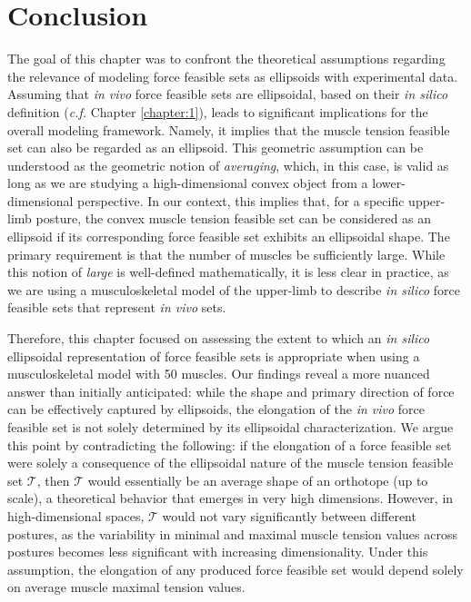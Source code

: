 \section{Conclusion}
The goal of this chapter was to confront the theoretical assumptions regarding the relevance of modeling force feasible sets as ellipsoids with experimental data. Assuming that \emph{in vivo} force feasible sets are ellipsoidal, based on their \emph{in silico} definition (\emph{c.f.} Chapter \ref{chapter:1}), leads to significant implications for the overall modeling framework. Namely, it implies that the muscle tension feasible set can also be regarded as an ellipsoid. This geometric assumption can be understood as the geometric notion of \emph{averaging}, which, in this case, is valid as long as we are studying a high-dimensional convex object from a lower-dimensional perspective. In our context, this implies that, for a specific upper-limb posture, the convex muscle tension feasible set can be considered as an ellipsoid if its corresponding force feasible set exhibits an ellipsoidal shape. The primary requirement is that the number of muscles be sufficiently large. While this notion of \emph{large} is well-defined mathematically, it is less clear in practice, as we are using a musculoskeletal model of the upper-limb to describe \emph{in silico} force feasible sets that represent \emph{in vivo} sets.

Therefore, this chapter focused on assessing the extent to which an \emph{in silico} ellipsoidal representation of force feasible sets is appropriate when using a musculoskeletal model with 50 muscles. Our findings reveal a more nuanced answer than initially anticipated: while the shape and primary direction of force can be effectively captured by ellipsoids, the elongation of the \emph{in vivo} force feasible set is not solely determined by its ellipsoidal characterization.  We argue this point by contradicting the following: if the elongation of a force feasible set were solely a consequence of the ellipsoidal nature of the muscle tension feasible set $\mathcal{T}$, then $\mathcal{T}$ would essentially be an average shape of an orthotope (up to scale), a theoretical behavior that emerges in very high dimensions. However, in high-dimensional spaces, $\mathcal{T}$ would not vary significantly between different postures, as the variability in minimal and maximal muscle tension values across postures becomes less significant with increasing dimensionality. Under this assumption, the elongation of any produced force feasible set would depend solely on average muscle maximal tension values.

